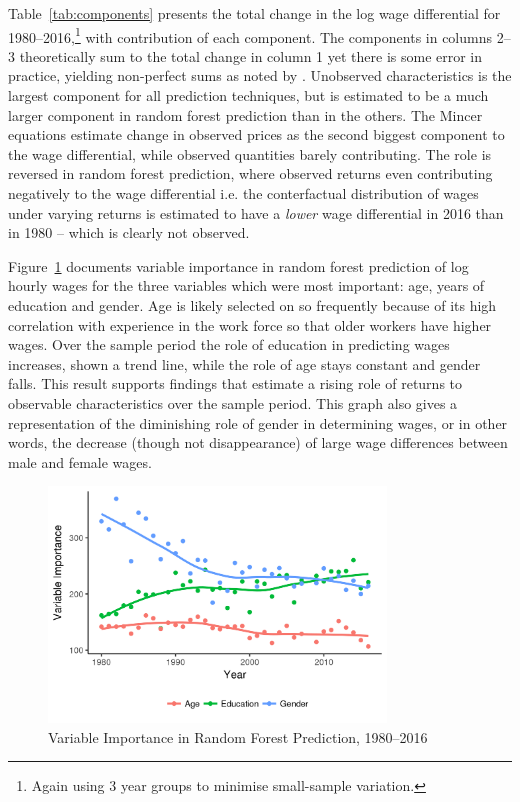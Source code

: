 \documentclass[notitlepage,12pt]{article}
\newcommand{\1}[1]{\ensuremath{\mathbb{1}\left( #1 \right)}}               %
\begin{document}
Table~\ref{tab:components} presents the total change in the log wage differential for 1980--2016,\footnote{Again using 3 year groups to minimise small-sample variation.} with contribution of each component.  The components in columns 2--3 theoretically sum to the total change in column 1 yet there is some error in practice, yielding non-perfect sums as noted by \cite{autor200914}.  Unobserved characteristics is the largest component for all prediction techniques, but is estimated to be a much larger component in random forest prediction than in the others.  The Mincer equations estimate change in observed prices as the second biggest component to the wage differential, while observed quantities barely contributing.  The role is reversed in random forest prediction, where observed returns even contributing negatively to the wage differential i.e. the conterfactual distribution of wages under varying returns is estimated to have a \textit{lower} wage differential in 2016 than in 1980 -- which is clearly not observed.

Figure~\ref{fig:variableimportance} documents variable importance in random forest prediction of log hourly wages for the three variables which were most important: age, years of education and gender.  Age is likely selected on so frequently because of its high correlation with experience in the work force so that older workers have higher wages.  Over the sample period the role of education in predicting wages increases, shown a trend line, while the role of age stays constant and gender falls.  This result supports findings that estimate a rising role of returns to observable characteristics over the sample period.  This graph also gives a representation of the diminishing role of gender in determining wages, or in other words, the decrease (though not disappearance) of large wage differences between male and female wages.
\begin{figure}[H]
  \centering
  \includegraphics[width=0.8\textwidth]{figures/importance_graph.png}
  \caption{Variable Importance in Random Forest Prediction, 1980--2016}
  \label{fig:variableimportance}
\end{figure}
\end{document}
